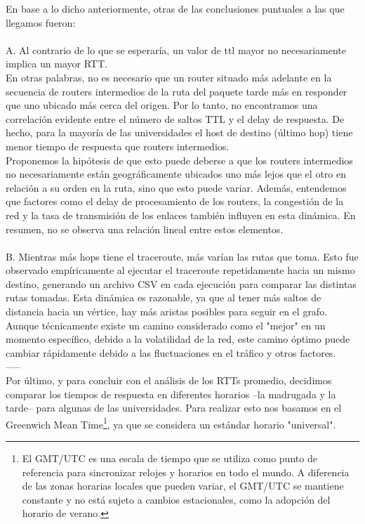 \documentclass{article}
\begin{document}
   
        En base a lo dicho anteriormente, otras de las conclusiones puntuales a las que llegamos fueron:\\
        \\
        A. Al contrario de lo que se esperaría, un valor de ttl mayor no necesariamente implica un mayor RTT.\\
        En otras palabras, no es necesario que un router situado más adelante en la secuencia de routers intermedios de la ruta del paquete tarde más en responder que uno ubicado más cerca del origen. Por lo tanto, no encontramos una correlación evidente entre el número de saltos TTL y el delay de respuesta. De hecho, para la mayoría de las universidades el host de destino (último hop) tiene menor tiempo de respuesta que routers intermedios.\\
        Proponemos la hipótesis de que esto puede deberse a que los routers intermedios no necesariamente están geográficamente ubicados uno más lejos que el otro en relación a su orden en la ruta, sino que esto puede variar. Además, entendemos que factores como el delay de procesamiento de los routers, la congestión de la red y la tasa de transmisión de los enlaces también influyen en esta dinámica. En resumen, no se observa una relación lineal entre estos elementos.\\	
        \\
        B. Mientras más hops tiene el traceroute, más varían las rutas que toma. 
        Esto fue observado empíricamente al ejecutar el traceroute repetidamente hacia un mismo destino, generando un archivo CSV en cada ejecución para comparar las distintas rutas tomadas. Esta dinámica es razonable, ya que al tener más saltos de distancia hacia un vértice, hay más aristas posibles para seguir en el grafo. Aunque técnicamente existe un camino considerado como el "mejor" en un momento específico, debido a la volatilidad de la red, este camino óptimo puede cambiar rápidamente debido a las fluctuaciones en el tráfico y otros factores.\\
        -----\\
        Por último, y para concluir con el análisis de los RTTs promedio, decidimos comparar los tiempos de respuesta en diferentes horarios –la madrugada y la tarde– para algunas de las universidades. Para realizar esto nos basamos en el Greenwich Mean Time\footnote{El GMT/UTC es una escala de tiempo que se utiliza como punto de referencia para sincronizar relojes y horarios en todo el mundo. A diferencia de las zonas horarias locales que pueden variar, el GMT/UTC se mantiene constante y no está sujeto a cambios estacionales, como la adopción del horario de verano.}, ya que se considera un estándar horario "universal". 
\end{document}
